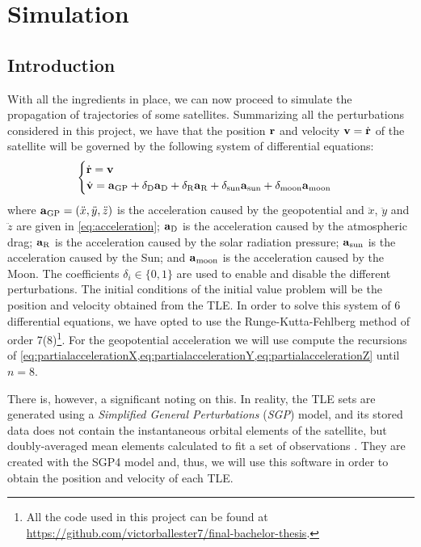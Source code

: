 \documentclass[../main.tex]{subfiles}
\begin{document}
\section{Simulation}\label{sec:simulation}
\subsection{Introduction}
With all the ingredients in place, we can now proceed to simulate the propagation of trajectories of some satellites.
Summarizing all the perturbations considered in this project, we have that the position $\boldsymbol{\mathrm{r}}$ and velocity $\boldsymbol{\mathrm{v}}=\dot{\boldsymbol{\mathrm{r}}}$ of the satellite will be governed by the following system of differential equations:
\begin{equation}
  \begin{cases}
    \dot{\boldsymbol{\mathrm{r}}}=\boldsymbol{\mathrm{v}} \\
    \dot{\boldsymbol{\mathrm{v}}}=\boldsymbol{\mathrm{a}}_{\mathrm{GP}} + \delta_{\mathrm{D}}\boldsymbol{\mathrm{a}}_{\mathrm{D}}+\delta_{\mathrm{R}}\boldsymbol{\mathrm{a}}_{\mathrm{R}}+\delta_{\mathrm{sun}}\boldsymbol{\mathrm{a}}_{\mathrm{sun}}+\delta_{\mathrm{moon}}\boldsymbol{\mathrm{a}}_\mathrm{moon}
  \end{cases}
\end{equation}
where $\boldsymbol{\mathrm{a}}_{\mathrm{GP}}=(\ddot{x},\ddot{y},\ddot{z})$ is the acceleration caused by the geopotential and $\ddot{x}$, $\ddot{y}$ and $\ddot{z}$ are given in \cref{eq:acceleration}; $\boldsymbol{\mathrm{a}}_{\mathrm{D}}$ is the acceleration caused by the atmospheric drag; $\boldsymbol{\mathrm{a}}_{\mathrm{R}}$ is the acceleration caused by the solar radiation pressure; $\boldsymbol{\mathrm{a}}_{\mathrm{sun}}$ is the acceleration caused by the Sun; and $\boldsymbol{\mathrm{a}}_{\mathrm{moon}}$ is the acceleration caused by the Moon. The coefficients $\delta_{i}\in\{0,1\}$ are used to enable and disable the different perturbations. The initial conditions of the initial value problem will be the position and velocity obtained from the TLE. In order to solve this system of 6 differential equations, we have opted to use the Runge-Kutta-Fehlberg method of order 7(8)\footnote{All the code used in this project can be found at \url{https://github.com/victorballester7/final-bachelor-thesis}.}. For the geopotential acceleration we will use compute the recursions of \cref{eq:partialaccelerationX,eq:partialaccelerationY,eq:partialaccelerationZ} until $n=8$.

There is, however, a significant noting on this. In reality, the TLE sets are generated using a \emph{Simplified General Perturbations} (\emph{SGP}) model, and its stored data does not contain the instantaneous orbital elements of the satellite, but doubly-averaged mean elements calculated to fit a set of observations \cite{celestrak,celestrakReport}.
They are created with the SGP4 model and, thus, we will use this software in order to obtain the position and velocity of each TLE.
\end{document}
